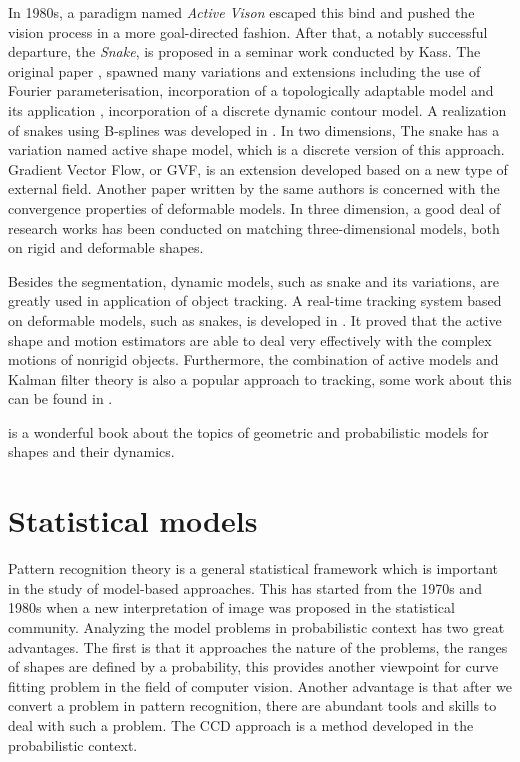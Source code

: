In 1980s, a paradigm named \textit{Active Vison}\cite{aloimonos1988active} escaped this bind and
pushed the vision process in a more goal-directed fashion. After that, a
notably successful departure, the \textit{Snake}, is proposed in a
seminar work conducted by Kass. The original paper
\cite{kass1988snakes}, spawned many variations
and extensions including the use of Fourier parameterisation\cite{scott1987alternative}, incorporation
of a topologically adaptable model\cite{mcinerney1995topologically} and
its application \cite{mcinemey1999topology}, incorporation of a discrete
dynamic contour model\cite{lobregt1995discrete}. A realization of snakes
using B-splines was developed in \cite{brigger2000b}. In two
dimensions, The snake has a variation named active shape
model\cite{cootes1995active}, which is a discrete version of this
approach. Gradient Vector Flow\cite{xu1998snakes}, or GVF, is an extension developed
based on a new type of external field. Another paper written by the same
authors \cite{xu2000gradient} is concerned with the convergence properties of
deformable models. In three dimension, a good deal of research works has
been conducted on matching three-dimensional models, both on rigid
\cite{harris1993tracking} and deformable\cite{terzopoulos1991dynamic} shapes. 

Besides the segmentation,
dynamic models, such as snake and its variations, are greatly used in application of object
tracking. A real-time tracking system based on deformable models, such
as snakes, is developed
in \cite{terzopoulos1992tracking}. It proved that the active shape and
motion estimators are able to deal very effectively with the complex
motions of nonrigid objects. Furthermore, the combination of active
models and Kalman filter theory is also a popular approach to
tracking, some work about this can be found in
\cite{schick1991simultaneous}.

\cite{blake1998active} is a wonderful book about the topics of
geometric and probabilistic models  for shapes and their dynamics.

\section{Statistical models}
\label{sec:sm}
Pattern recognition theory is a general statistical framework which is
important in the study of model-based approaches. This has started from the 1970s
and 1980s when a new interpretation of image was proposed in the
statistical community.  Analyzing the model problems in probabilistic
context has two great advantages. The first is that it approaches the
nature of the problems, the ranges of shapes are defined by a
probability, this provides another viewpoint for curve fitting problem
in the field of computer vision. Another advantage is that after we
convert a problem in pattern recognition, there are abundant tools and
skills to deal with such a problem. 
The CCD approach is a method developed in the probabilistic context. 

